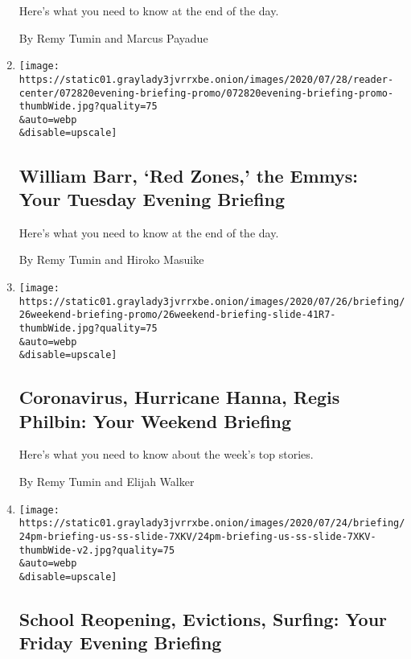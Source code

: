 \begin{enumerate}
  Here's what you need to know at the end of the day.

  By Remy Tumin and Marcus Payadue
\item
  \href{/2020/07/28/briefing/william-barr-red-zones-the-emmys.html}{}

  \texttt{[image: https://static01.graylady3jvrrxbe.onion/images/2020/07/28/reader-center/072820evening-briefing-promo/072820evening-briefing-promo-thumbWide.jpg?quality=75\\\&auto=webp\\\&disable=upscale]}

  \hypertarget{william-barr-red-zones-the-emmys-your-tuesday-evening-briefing}{%
  \subsection{William Barr, `Red Zones,' the Emmys: Your Tuesday Evening
  Briefing}\label{william-barr-red-zones-the-emmys-your-tuesday-evening-briefing}}

  Here's what you need to know at the end of the day.

  By Remy Tumin and Hiroko Masuike
\item
  \href{/2020/07/26/briefing/coronavirus-hurricane-hanna-regis-philbin.html}{}

  \texttt{[image: https://static01.graylady3jvrrxbe.onion/images/2020/07/26/briefing/26weekend-briefing-promo/26weekend-briefing-slide-41R7-thumbWide.jpg?quality=75\\\&auto=webp\\\&disable=upscale]}

  \hypertarget{coronavirus-hurricane-hanna-regis-philbin-your-weekend-briefing}{%
  \subsection{Coronavirus, Hurricane Hanna, Regis Philbin: Your Weekend
  Briefing}\label{coronavirus-hurricane-hanna-regis-philbin-your-weekend-briefing}}

  Here's what you need to know about the week's top stories.

  By Remy Tumin and Elijah Walker
\item
  \href{/2020/07/24/briefing/school-reopening-evictions-surfing.html}{}

  \texttt{[image: https://static01.graylady3jvrrxbe.onion/images/2020/07/24/briefing/24pm-briefing-us-ss-slide-7XKV/24pm-briefing-us-ss-slide-7XKV-thumbWide-v2.jpg?quality=75\\\&auto=webp\\\&disable=upscale]}

  \hypertarget{school-reopening-evictions-surfing-your-friday-evening-briefing}{%
  \subsection{School Reopening, Evictions, Surfing: Your Friday Evening
  Briefing}\label{school-reopening-evictions-surfing-your-friday-evening-briefing}}


\end{enumerate}
